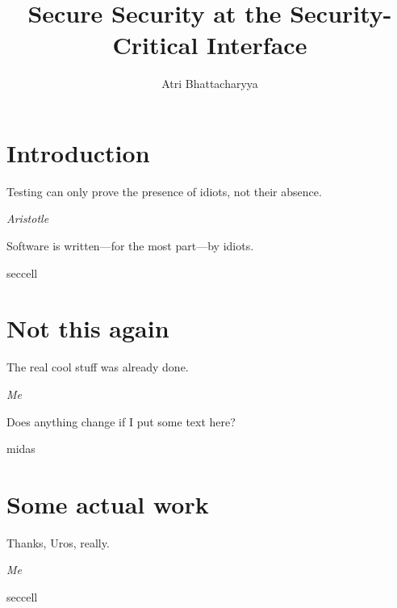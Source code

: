 \documentclass[lablogo]{thesis}
\title{Secure Security at the Security-Critical Interface}
\author{Atri Bhattacharyya}
\begin{document}
\chapter{Introduction}
\epigraph{Testing can only prove the presence of idiots, not their absence.}%
         {\textit{Aristotle}}
Software is written---for the most part---by idiots.


\begin{namedscope}{seccell}
\chapter{Not this again}
\label{ch:seccell}
\epigraph{The real cool stuff was already done.}%
        {\textit{Me}}

Does anything change if I put some text here?


\end{namedscope}

\begin{namedscope}{midas}
  \chapter{Some actual work}
  \label{ch:midas}
  \epigraph{Thanks, Uros, really.}%
          {\textit{Me}}


\end{namedscope}

\appendices

\begin{namedscope}{seccell}

\end{namedscope}


\backmatter


{}

\end{document}
